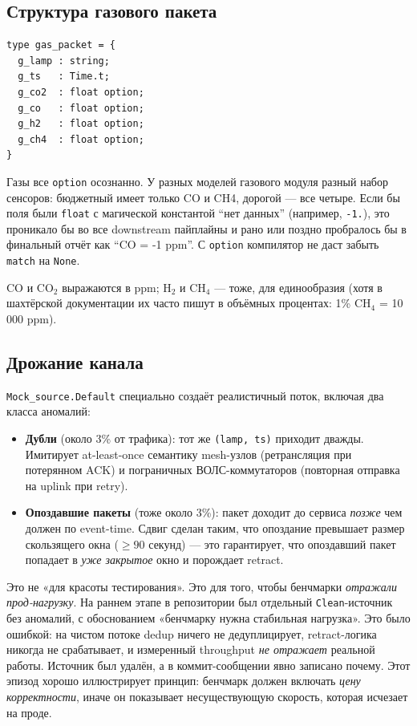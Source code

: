 \subsection{Структура газового пакета}

\begin{lstlisting}
type gas_packet = {
  g_lamp : string;
  g_ts   : Time.t;
  g_co2  : float option;
  g_co   : float option;
  g_h2   : float option;
  g_ch4  : float option;
}
\end{lstlisting}

Газы все \texttt{option} осознанно. У разных моделей газового
модуля разный набор сенсоров: бюджетный имеет только CO и CH4,
дорогой --- все четыре. Если бы поля были \texttt{float} с
магической константой ``нет данных'' (например, \texttt{-1.}), это
проникало бы во все downstream пайплайны и рано или поздно
пробралось бы в финальный отчёт как ``CO = -1 ppm''. С
\texttt{option} компилятор не даст забыть \texttt{match} на
\texttt{None}.

CO и CO$_2$ выражаются в ppm; H$_2$ и CH$_4$ --- тоже, для
единообразия (хотя в шахтёрской документации их часто пишут в
объёмных процентах: 1\% CH$_4$ = 10\,000 ppm).

\subsection{Дрожание канала}

\texttt{Mock\_source.Default} специально создаёт реалистичный поток,
включая два класса аномалий:

\begin{itemize}
\item \textbf{Дубли} (около 3\% от трафика): тот же
\texttt{(lamp, ts)} приходит дважды. Имитирует at-least-once
семантику mesh-узлов (ретрансляция при потерянном ACK) и пограничных
ВОЛС-коммутаторов (повторная отправка на uplink при retry).
\item \textbf{Опоздавшие пакеты} (тоже около 3\%): пакет
доходит до сервиса \emph{позже} чем должен по event-time. Сдвиг
сделан таким, что опоздание превышает размер скользящего окна
($\geq 90$ секунд) --- это гарантирует, что опоздавший пакет попадает
в \emph{уже закрытое} окно и порождает retract.
\end{itemize}

Это не «для красоты тестирования». Это для того, чтобы бенчмарки
\emph{отражали прод-нагрузку}. На раннем этапе в репозитории был
отдельный \texttt{Clean}-источник без аномалий, с обоснованием
«бенчмарку нужна стабильная нагрузка». Это было ошибкой: на чистом
потоке dedup ничего не дедуплицирует, retract-логика никогда не
срабатывает, и измеренный throughput \emph{не отражает} реальной
работы. Источник был удалён, а в коммит-сообщении явно записано
почему. Этот эпизод хорошо иллюстрирует принцип: бенчмарк должен
включать \emph{цену корректности}, иначе он показывает
несуществующую скорость, которая исчезает на проде.

